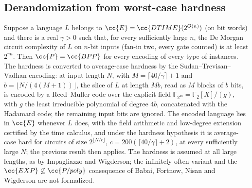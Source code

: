 \begin{result}
\subsection{Derandomization from worst-case hardness}
Suppose a language $L$ belongs to $\cc{E}=\cc{DTIME}(2^{O(n)})$ (on bit words) and
there is a real $\gamma>0$ such that, for every sufficiently large $n$, the De Morgan
circuit complexity of $L$ on $n$-bit inputs (fan-in two, every gate counted) is at
least $2^{\gamma n}$. Then $\cc{P}=\cc{BPP}$ for every encoding of every type of
instances. The hardness is converted to average-case hardness by the
Sudan--Trevisan--Vadhan encoding: at input length $N$, with $M=\lceil 40/\gamma\rceil+1$
and $b=\lfloor N/(4(M+1))\rfloor$, the slice of $L$ at length $Mb$, read as $M$ blocks
of $b$ bits, is encoded by a Reed--Muller code over the explicit field
$\mathbb{F}_{2^{4b}}=\mathbb{F}_2[X]/(g)$, with $g$ the least irreducible polynomial of
degree $4b$, concatenated with the Hadamard code; the remaining input bits are
ignored. The encoded language lies in $\cc{E}$ whenever $L$ does, with the field
arithmetic and low-degree extension certified by the time calculus, and under the
hardness hypothesis it is average-case hard for circuits of size
$2^{\lfloor N/c\rfloor}$, $c=200(\lceil 40/\gamma\rceil+2)$, at every sufficiently
large $N$; the previous result then applies. The hardness is assumed at all large
lengths, as by Impagliazzo and Wigderson; the infinitely-often variant and the
$\cc{EXP}\not\subseteq\cc{P/poly}$ consequence of Babai, Fortnow, Nisan and
Wigderson are not formalized.\citep{ImpagliazzoWigderson1997,SudanTrevisanVadhan2001}
\end{result}
